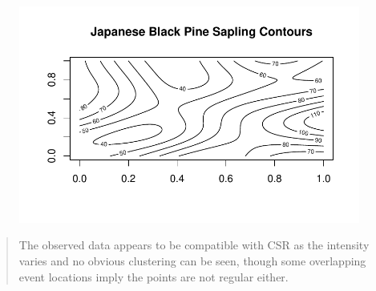 \documentclass[
  letterpaper,
  DIV=11,
  numbers=noendperiod]{scrartcl}
\newenvironment{Shaded}{\begin{snugshade}}{\end{snugshade}}
\newcommand{\AttributeTok}[1]{\textcolor[rgb]{0.40,0.45,0.13}{#1}}
\newcommand{\DecValTok}[1]{\textcolor[rgb]{0.68,0.00,0.00}{#1}}
\newcommand{\FunctionTok}[1]{\textcolor[rgb]{0.28,0.35,0.67}{#1}}
\newcommand{\NormalTok}[1]{\textcolor[rgb]{0.00,0.23,0.31}{#1}}
\newcommand{\OtherTok}[1]{\textcolor[rgb]{0.00,0.23,0.31}{#1}}
\newcommand{\SpecialCharTok}[1]{\textcolor[rgb]{0.37,0.37,0.37}{#1}}
\newcommand{\StringTok}[1]{\textcolor[rgb]{0.13,0.47,0.30}{#1}}
\begin{document}
\begin{Shaded}
\end{Shaded}

\begin{figure}[H]

{\centering \includegraphics{robby_homework1_files/figure-pdf/unnamed-chunk-14-1.pdf}

}

\end{figure}

\begin{quote}
The observed data appears to be compatible with CSR as the intensity
varies and no obvious clustering can be seen, though some overlapping
event locations imply the points are not regular either.
\end{quote}
\end{document}
